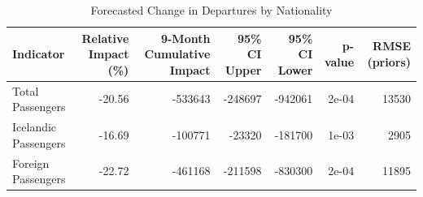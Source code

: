 \begin{table}

\caption{Forecasted Change in Departures by Nationality}
\centering
\begin{tabular}[t]{l|r|r|r|r|r|r}
\hline
Indicator & Relative Impact (\%) & 9-Month Cumulative Impact & 95\% CI Upper & 95\% CI Lower & p-value & RMSE (priors)\\
\hline
Total Passengers & -20.56 & -533643 & -248697 & -942061 & 2e-04 & 13530\\
\hline
Icelandic Passengers & -16.69 & -100771 & -23320 & -181700 & 1e-03 & 2905\\
\hline
Foreign Passengers & -22.72 & -461168 & -211598 & -830300 & 2e-04 & 11895\\
\hline
\end{tabular}
\end{table}
